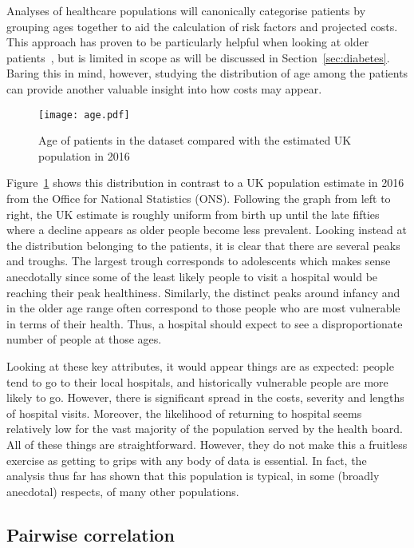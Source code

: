 Analyses of healthcare populations will canonically categorise patients by
grouping ages together to aid the calculation of risk factors and projected
costs. This approach has proven to be particularly helpful when looking at older
patients~\cite{Billings327}, but is limited in scope as will be discussed in
Section~\ref{sec:diabetes}. Baring this in mind, however, studying the
distribution of age among the patients can provide another valuable insight into
how costs may appear.

\begin{figure}
    \centering
    \texttt{[image: age.pdf]}
    \caption{%
        Age of patients in the dataset compared with the estimated UK population
        in 2016
    }\label{fig:age}
\end{figure}

Figure~\ref{fig:age} shows this distribution in contrast to a UK population
estimate in 2016 from the Office for National Statistics (ONS). Following the
graph from left to right, the UK estimate is roughly uniform from birth up until
the late fifties where a decline appears as older people become less prevalent.
Looking instead at the distribution belonging to the patients, it is clear that
there are several peaks and troughs. The largest trough corresponds to
adolescents which makes sense anecdotally since some of the least likely people
to visit a hospital would be reaching their peak healthiness.  Similarly, the
distinct peaks around infancy and in the older age range often correspond to
those people who are most vulnerable in terms of their health.  Thus, a hospital
should expect to see a disproportionate number of people at those ages.

Looking at these key attributes, it would appear things are as expected: people
tend to go to their local hospitals, and historically vulnerable people are more
likely to go. However, there is significant spread in the costs, severity and
lengths of hospital visits. Moreover, the likelihood of returning to hospital
seems relatively low for the vast majority of the population served by the
health board. All of these things are straightforward. However, they do not make
this a fruitless exercise as getting to grips with any body of data is
essential. In fact, the analysis thus far has shown that this population is
typical, in some (broadly anecdotal) respects, of many other populations.


\subsection{Pairwise correlation}\label{subsec:corr}

